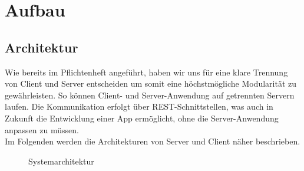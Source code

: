\section{Aufbau}

\subsection{Architektur}
Wie bereits im Pflichtenheft angeführt, haben wir uns für eine klare Trennung von Client und Server entscheiden um somit eine höchstmögliche Modularität zu gewährleisten. So können Client- und Server-Anwendung auf getrennten Servern laufen. Die Kommunikation erfolgt über REST-Schnittstellen, was auch in Zukunft die Entwicklung einer App ermöglicht, ohne die Server-Anwendung anpassen zu müssen. \\
Im Folgenden werden die Architekturen von Server und Client näher beschrieben.
\begin{figure}{}
	\caption{Systemarchitektur}
\end{figure}
